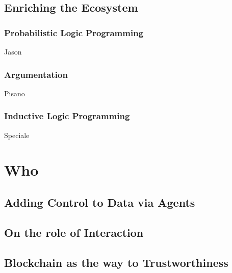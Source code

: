 \documentclass[12pt,a4paper,openright,twoside]{book}
\begin{document}
\chapter{Enriching the Ecosystem}

\section{Probabilistic Logic Programming}

Jason

\section{Argumentation}

Pisano

\section{Inductive Logic Programming}

Speciale

\part{Who}
\label{part:who}

\cite{imagination-extraamas2021}
\cite{expectation-extraamas2021}

\chapter{Adding Control to Data via Agents}

\chapter{On the role of Interaction}

\cite{tusow-icccn2019}
\cite{respect-idc2017}
\cite{respectx-comsis15}

\chapter{Blockchain as the way to Trustworthiness}

\cite{bctcoord-bct4mas2018wi}
\cite{bctcoord-bct4mas2019}
\cite{bctcoordination-information11}
\cite{blockchain-goodtechs2018}
\cite{proactivesc-blockchain2019}
\cite{blockchainmas-applsci10}



\backmatter

\part*{}



\end{document}
